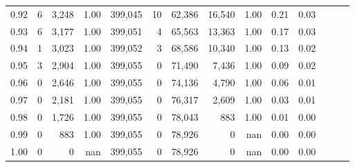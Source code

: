 \begin{tabular}{rrrrrrrrrrrrrr}
0.92 &      6 &  3,248 &  1.00 &  399,045 &       10 &  62,386 &  16,540 &  1.00 &  0.21 &      0.03 \\
0.93 &      6 &  3,177 &  1.00 &  399,051 &        4 &  65,563 &  13,363 &  1.00 &  0.17 &      0.03 \\
0.94 &      1 &  3,023 &  1.00 &  399,052 &        3 &  68,586 &  10,340 &  1.00 &  0.13 &      0.02 \\
0.95 &      3 &  2,904 &  1.00 &  399,055 &        0 &  71,490 &   7,436 &  1.00 &  0.09 &      0.02 \\
0.96 &      0 &  2,646 &  1.00 &  399,055 &        0 &  74,136 &   4,790 &  1.00 &  0.06 &      0.01 \\
0.97 &      0 &  2,181 &  1.00 &  399,055 &        0 &  76,317 &   2,609 &  1.00 &  0.03 &      0.01 \\
0.98 &      0 &  1,726 &  1.00 &  399,055 &        0 &  78,043 &     883 &  1.00 &  0.01 &      0.00 \\
0.99 &      0 &    883 &  1.00 &  399,055 &        0 &  78,926 &       0 &   nan &  0.00 &      0.00 \\
1.00 &      0 &      0 &   nan &  399,055 &        0 &  78,926 &       0 &   nan &  0.00 &      0.00 \\
\bottomrule
\end{tabular}
